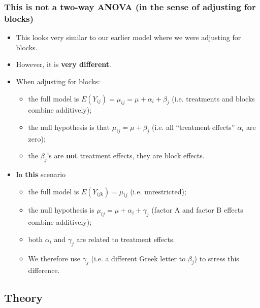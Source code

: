 \documentclass[a4paper]{article}
\begin{document}
\subsubsection{This is not a two-way ANOVA (in the sense of adjusting for blocks)}
\begin{itemize}
	\item This looks very similar to our earlier model where we were adjusting for blocks.
	\item However, it is \textbf{very different}.
	\item When adjusting for blocks:
	\begin{itemize}
		\item the full model is \( E(Y_{ij})=\mu_{ij}=\mu+\alpha_i+\beta_j \) (i.e. treatments and blocks combine additively);
		\item the null hypothesis is that \( \mu_{ij} = \mu + \beta_j \) (i.e. all ``treatment effects'' \( \alpha_i \) are zero);
		\item the \( \beta_j \)'s are \textbf{not} treatment effects, they are block effects.
	\end{itemize}
	\item In \textbf{this} scenario
	\begin{itemize}
		\item the full model is \( E(Y_{ijk}) = \mu_{ij} \) (i.e. unrestricted);
		\item the null hypothesis is \( \mu_{ij}=\mu+\alpha_i+\gamma_j \) (factor A and factor B effects combine additively);
		\item both \( \alpha_i \) and \( \gamma_j \) are related to treatment effects.
		\item We therefore use \( \gamma_j \) (i.e. a different Greek letter to \( \beta_j \)) to stress this difference.
	\end{itemize}
\end{itemize}
\subsection{Theory}
\end{document}

